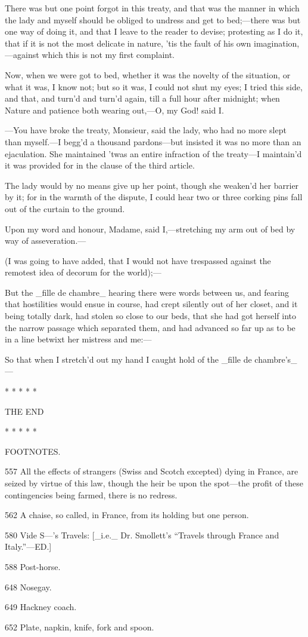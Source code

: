 \documentclass[twoside]{article}
\begin{document}
There was but one point forgot in this treaty, and that was the manner in
which the lady and myself should be obliged to undress and get to
bed;—there was but one way of doing it, and that I leave to the reader to
devise; protesting as I do it, that if it is not the most delicate in
nature, ’tis the fault of his own imagination,—against which this is not
my first complaint.

Now, when we were got to bed, whether it was the novelty of the
situation, or what it was, I know not; but so it was, I could not shut my
eyes; I tried this side, and that, and turn’d and turn’d again, till a
full hour after midnight; when Nature and patience both wearing out,—O,
my God! said I.

—You have broke the treaty, Monsieur, said the lady, who had no more
slept than myself.—I begg’d a thousand pardons—but insisted it was no
more than an ejaculation.  She maintained ’twas an entire infraction of
the treaty—I maintain’d it was provided for in the clause of the third
article.

The lady would by no means give up her point, though she weaken’d her
barrier by it; for in the warmth of the dispute, I could hear two or
three corking pins fall out of the curtain to the ground.

Upon my word and honour, Madame, said I,—stretching my arm out of bed by
way of asseveration.—

(I was going to have added, that I would not have trespassed against the
remotest idea of decorum for the world);—

But the _fille de chambre_ hearing there were words between us, and
fearing that hostilities would ensue in course, had crept silently out of
her closet, and it being totally dark, had stolen so close to our beds,
that she had got herself into the narrow passage which separated them,
and had advanced so far up as to be in a line betwixt her mistress and
me:—

So that when I stretch’d out my hand I caught hold of the _fille de
chambre’s_—

                                * * * * *

                                 THE END

                                * * * * *




FOOTNOTES.


{557}  All the effects of strangers (Swiss and Scotch excepted) dying in
France, are seized by virtue of this law, though the heir be upon the
spot—the profit of these contingencies being farmed, there is no redress.

{562}  A chaise, so called, in France, from its holding but one person.

{580}  Vide S—’s Travels: [_i.e._ Dr. Smollett’s “Travels through France
and Italy.”—ED.]

{588}  Post-horse.

{648}  Nosegay.

{649}  Hackney coach.

{652}  Plate, napkin, knife, fork and spoon.
\end{document}
